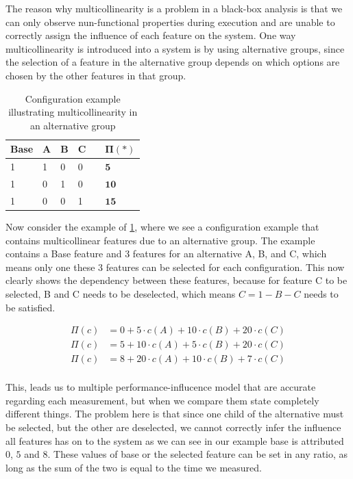The reason why multicollinearity is a problem in a black-box analysis is
that we can only observe nun-functional properties during execution and are unable to correctly assign the influence of each feature
on the system. One way multicollinearity is introduced into a system is by using alternative groups, since the selection of a feature in the
alternative group depends on which options are chosen by the other features in that group. \cite{Multicollinearity}
\pagebreak

\begin{table}[h]
    \centering
    \begin{tabular}{llllll}
    \hline
    Base & A & B & C &  & $\bm{\Pi(*)}$ \\ \hline
    1 & 1 & 0 & 0 &  & $\mathbf{5}$  \\
    1 & 0 & 1 & 0 &  & $\mathbf{10}$  \\  
    1 & 0 & 0 & 1 &  & $\mathbf{15}$  \\\hline
    \end{tabular}  
    \caption{Configuration example illustrating multicollinearity in an alternative group}\label{tab:alternative}
\end{table}

Now consider the example of \ref{tab:alternative}, where we see a configuration example that contains multicollinear features due to an alternative group.
The example contains a Base feature and 3 features for an alternative A, B, and C, which means only one these 3 features can be selected for each
configuration.
This now clearly shows the dependency between these features, because for feature C to be selected, B and C needs to be deselected, which means
$C = 1 - B - C$ needs to be satisfied. 

\begin{align*}
    \Pi(c) &= 0 + 5 \cdot c(A) + 10\cdot c(B) + 20\cdot c(C) \\
    \Pi(c) &= 5 + 10 \cdot c(A) + 5\cdot c(B) + 20\cdot c(C) \\
    \Pi(c) &= 8 + 20 \cdot c(A) + 10\cdot c(B) + 7\cdot c(C) \\
\end{align*}

This, leads us to multiple performance-influcence model that are accurate regarding each measurement, but when we
compare them state completely different things. 
The problem here is that since one child of the alternative must be selected, but the other are deselected, we cannot correctly infer the influence
all features has on to the system as we can see in our example base is attributed $0$, $5$ and $8$. 
These values of base or the selected feature can be set in any ratio, as long as the sum of the two is equal to the time we measured.

